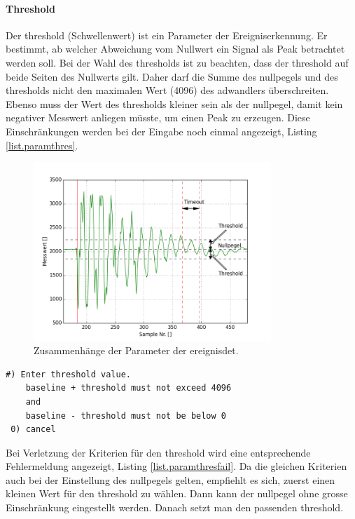 \paragraph{Threshold} Der \gls{threshold} (Schwellenwert) ist ein Parameter der Ereigniserkennung. Er bestimmt, ab welcher Abweichung vom Nullwert ein Signal als Peak betrachtet werden soll. Bei der Wahl des \gls{threshold}s ist zu beachten, dass der \gls{threshold} auf beide Seiten des Nullwerts gilt. Daher darf die Summe des \gls{nullpegel}s und des \gls{threshold}s nicht den maximalen Wert (4096) des \gls{adwandler}s überschreiten. Ebenso muss der Wert des \gls{threshold}s kleiner sein als der \gls{nullpegel}, damit kein negativer Messwert anliegen müsste, um einen Peak zu erzeugen. Diese Einschränkungen werden bei der Eingabe noch einmal angezeigt, Listing \ref{list.paramthres}.

\begin{figure}
	\centering
		\includegraphics[width=0.8\textwidth]{images/impact_params.png}
	\caption{Zusammenhänge der Parameter der \gls{ereignisdet}.}
	\label{fig.params}
\end{figure}

\begin{lstlisting}[caption=Untermenü Threshold, label=list.paramthres]
 #) Enter threshold value.
    baseline + threshold must not exceed 4096
    and
    baseline - threshold must not be below 0
 0) cancel
\end{lstlisting}

Bei Verletzung der Kriterien für den \gls{threshold} wird eine entsprechende Fehlermeldung angezeigt, Listing \ref{list.paramthresfail}. Da die gleichen Kriterien auch bei der Einstellung des \gls{nullpegel}s gelten, empfiehlt es sich, zuerst einen kleinen Wert für den \gls{threshold} zu wählen. Dann kann der \gls{nullpegel} ohne grosse Einschränkung eingestellt werden. Danach setzt man den passenden \gls{threshold}.

